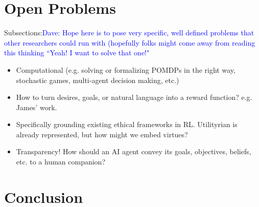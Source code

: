 \documentclass[11pt]{article}
\newcommand\davenote[1]{\textcolor{blue}{Dave: #1}}
\begin{document}
\section{Open Problems}

Subsections:\davenote{Hope here is to pose very specific, well defined problems that other researchers could run with (hopefully folks might come away from reading this thinking ``Yeah! I want to solve that one!"}
\begin{itemize}
\item Computational (e.g. solving or formalizing POMDPs in the right way, stochastic games, multi-agent decision making, etc.)
\item How to turn desires, goals, or natural language into a reward function? e.g. James' work.
\item Specifically grounding existing ethical frameworks in RL. Utilityrian is already represented, but how might we embed virtues?
\item Transparency! How should an AI agent convey its goals, objectives, beliefs, etc. to a human companion?
\end{itemize}


\section{Conclusion}




\end{document}
